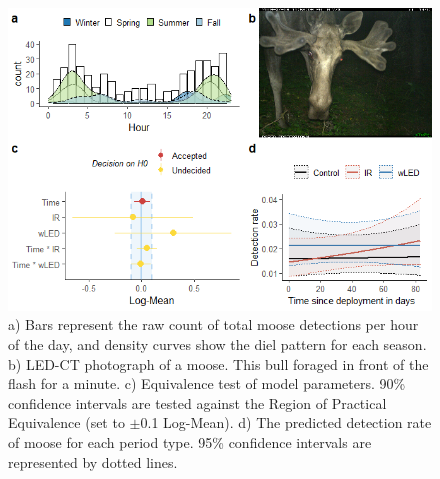 \begin{figure}
		  \centering
	\includegraphics[width=13cm]{../R/glmm_sp_files/figure-html/elg2-1.png}
\caption[Moose]
{\footnotesize
	a) Bars represent the raw count of total moose detections per hour of the day, and density curves show the diel pattern for each season.
	b) LED-CT photograph of a moose. This bull foraged in front of the flash for a minute.
	c) Equivalence test of model parameters. 90\% confidence intervals are tested against the Region of Practical Equivalence (set to $\pm$0.1 Log-Mean).
	d) The predicted detection rate of moose for each period type. 95\% confidence intervals are represented by dotted lines.}
\label{elg}
\end{figure}

